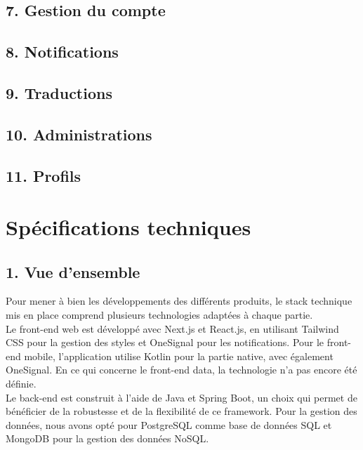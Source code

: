 \documentclass{report}
\begin{document}
\subsection*{7. Gestion du compte} %
\vspace{0.2cm}
\subsection*{8. Notifications}
\vspace{0.2cm}
\subsection*{9. Traductions}
\vspace{0.2cm}
\subsection*{10. Administrations}
\vspace{0.2cm}
\subsection*{11. Profils} %
\vspace{0.2cm}

\section*{\centering Spécifications techniques}
\vspace{0.2cm}
\subsection*{1. Vue d’ensemble}
\vspace{0.2cm}
\noindent Pour mener à bien les développements des différents produits, le stack technique mis en place comprend plusieurs technologies adaptées à chaque partie. \\

\noindent Le front-end web est développé avec Next.js et React.js, en utilisant Tailwind CSS pour la gestion des styles et OneSignal pour les notifications. Pour le front-end mobile, l'application utilise Kotlin pour la partie native, avec également OneSignal. En ce qui concerne le front-end data, la technologie n'a pas encore été définie. \\

\noindent Le back-end est construit à l'aide de Java et Spring Boot, un choix qui permet de bénéficier de la robustesse et de la flexibilité de ce framework. Pour la gestion des données, nous avons opté pour PostgreSQL comme base de données SQL et MongoDB pour la gestion des données NoSQL. \\
\end{document}
